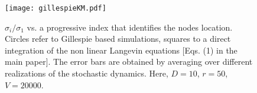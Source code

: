 \documentclass[showpacs,prl,superscriptaddress,nofootinbib, twocolumn]{revtex4}
\begin{document}
\begin{figure}
 \centering
   {\texttt{[image: gillespieKM.pdf]}} 
   \caption{ $\sigma_i/\sigma_1$ vs. a progressive index that identifies the nodes location. Circles refer to Gillespie based simulations, squares to a direct integration of the non linear Langevin equations [Eqs. (1) in the main paper]. The error bars are obtained by averaging over different realizations of the stochastic dynamics. Here, $D=10$, $r=50$, $V = 20000$.}
   \label{fig7}
  \end{figure}
\end{document}
